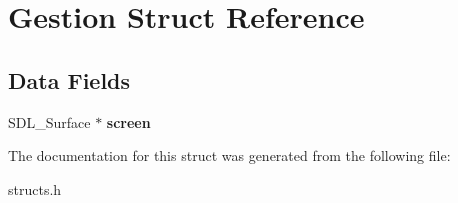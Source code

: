\hypertarget{structGestion}{}\section{Gestion Struct Reference}
\label{structGestion}
\subsection*{Data Fields}
\begin{DoxyCompactItemize}
\item 
\mbox{\label{structGestion_a6010de7d100c2fde67ca62ecae10c514}} 
S\+D\+L\+\_\+\+Surface $\ast$ {\bfseries screen}
\end{DoxyCompactItemize}


The documentation for this struct was generated from the following file\+:\begin{DoxyCompactItemize}
\item 
structs.\+h\end{DoxyCompactItemize}
